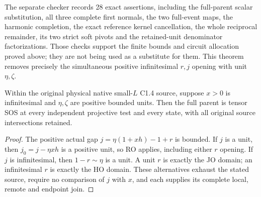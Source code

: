 The separate checker records 28 exact assertions, including the
full-parent scalar substitution, all three complete first normals,
the two full-event maps, the harmonic completion, the exact reference
kernel cancellation, the whole reciprocal remainder, its two strict
soft pivots and the retained-unit denominator factorizations.
Those checks support the finite bounds and circuit allocation proved
above; they are not being used as a substitute for them.
This theorem removes precisely the simultaneous positive
infinitesimal $r,j$ opening with unit $\eta,\zeta$.

\begin{corollary}
Within the original physical native small-$L$ C1.4 source, suppose
$x>0$ is infinitesimal and $\eta,\zeta$ are positive bounded units.
Then the full parent is tensor SOS at every independent projective
test and every state, with all original source intersections retained.
\end{corollary}
\begin{proof}
The positive actual gap $j=\eta(1+xh)-1+r$ is bounded.
If $j$ is a unit, then $j_0=j-\eta xh$ is a positive unit,
so RO applies, including either $r$ opening. If $j$ is infinitesimal,
then $1-r\sim\eta$ is a unit. A unit $r$ is exactly the JO domain;
an infinitesimal $r$ is exactly the HO domain. These alternatives
exhaust the stated source, require no comparison of $j$ with $x$,
and each supplies its complete local, remote and endpoint join.
\end{proof}
